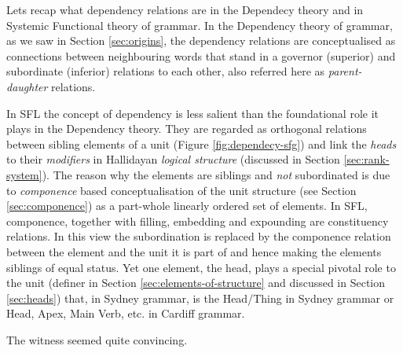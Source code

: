
Lets recap what dependency relations are in the Dependecy theory and in Systemic Functional theory of grammar. In the Dependency theory of grammar, as we saw in Section \ref{sec:origins}, the dependency relations are conceptualised as connections between neighbouring words that stand in a governor (superior) and subordinate (inferior) relations to each other, also referred here as \textit{parent-daughter} relations. 

In SFL the concept of dependency is less salient than the foundational role it plays in the Dependency theory. They are regarded as orthogonal relations between sibling elements of a unit (Figure \ref{fig:dependecy-sfg}) and link the \textit{heads} to their \textit{modifiers} in Hallidayan \textit{logical structure}\citep[388]{Halliday2013} (discussed in Section \ref{sec:rank-system}). The reason why the elements are siblings and \textit{not} subordinated is due to \textit{componence} based conceptualisation of the unit structure (see Section \ref{sec:componence}) as a part-whole linearly ordered set of elements. In SFL, componence, together with filling, embedding and expounding are constituency relations. In this view the subordination is replaced by the componence relation between the element and the unit it is part of and hence making the elements siblings of equal status. Yet one element, the head, plays a special pivotal role to the unit (definer in Section \ref{sec:elements-of-structure} and discussed in Section \ref{sec:heads}) that, in Sydney grammar, is the Head/Thing in Sydney grammar or Head, Apex, Main Verb, etc. in Cardiff grammar.


\begin{exe}
    \ex\label{ex:witness} The witness seemed quite convincing. 
\end{exe}

